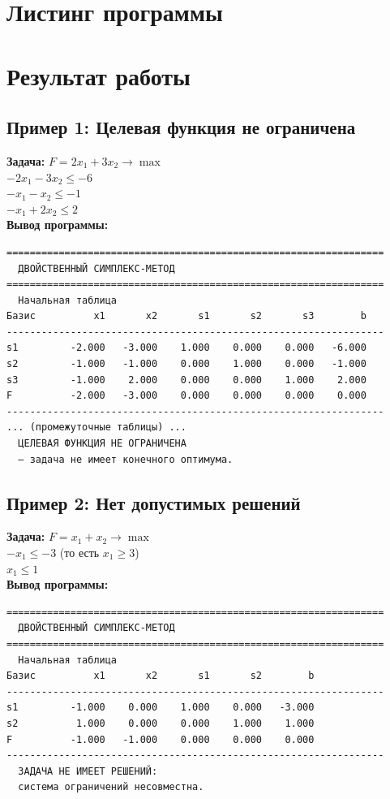\documentclass[oneside,a4paper,14pt]{extarticle}
\begin{document}
\section{Листинг программы}



\newpage

\section{Результат работы}
\subsection{Пример 1: Целевая функция не ограничена}
\textbf{Задача:}
$F = 2x_1 + 3x_2 \to \max$ \\
$-2x_1 - 3x_2 \le -6$ \\
$-x_1 - x_2 \le -1$ \\
$-x_1 + 2x_2 \le 2$ \\

\textbf{Вывод программы:}
\begin{verbatim}
=================================================================
  ДВОЙСТВЕННЫЙ СИМПЛЕКС-МЕТОД
=================================================================
  Начальная таблица
Базис          x1       x2       s1       s2       s3        b
-----------------------------------------------------------------
s1         -2.000   -3.000    1.000    0.000    0.000   -6.000
s2         -1.000   -1.000    0.000    1.000    0.000   -1.000
s3         -1.000    2.000    0.000    0.000    1.000    2.000
F          -2.000   -3.000    0.000    0.000    0.000    0.000
-----------------------------------------------------------------
... (промежуточные таблицы) ...
  ЦЕЛЕВАЯ ФУНКЦИЯ НЕ ОГРАНИЧЕНА
  — задача не имеет конечного оптимума.
\end{verbatim}

\subsection{Пример 2: Нет допустимых решений}
\textbf{Задача:}
$F = x_1 + x_2 \to \max$ \\
$-x_1 \le -3$ (то есть $x_1 \ge 3$) \\
$x_1 \le 1$ \\

\textbf{Вывод программы:}
\begin{verbatim}
=================================================================
  ДВОЙСТВЕННЫЙ СИМПЛЕКС-МЕТОД
=================================================================
  Начальная таблица
Базис          x1       x2       s1       s2        b
-----------------------------------------------------------------
s1         -1.000    0.000    1.000    0.000   -3.000
s2          1.000    0.000    0.000    1.000    1.000
F          -1.000   -1.000    0.000    0.000    0.000
-----------------------------------------------------------------
  ЗАДАЧА НЕ ИМЕЕТ РЕШЕНИЙ:
  система ограничений несовместна.
\end{verbatim}
\end{document}
